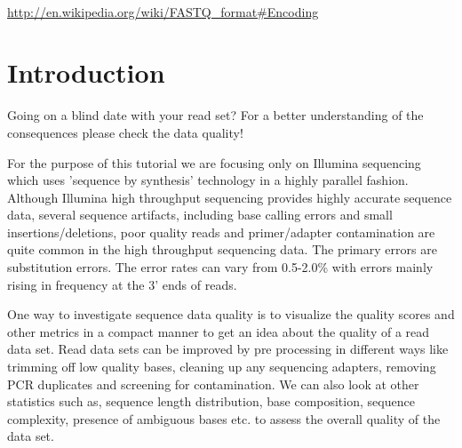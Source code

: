 \begin{description}[style=multiline,labelindent=0cm,align=left,leftmargin=0.5cm]
  \item[FASTQ Encoding]\hfill\\
    \url{http://en.wikipedia.org/wiki/FASTQ_format#Encoding}
\end{description}


\newpage

\section{Introduction}

\begin{note}
Going on a blind date with your read set? For a better understanding of the
consequences please check the data quality!
\end{note}

For the purpose of this tutorial we are focusing only on Illumina sequencing
which uses 'sequence by synthesis' technology in a highly parallel fashion.
Although Illumina high throughput  sequencing provides highly accurate sequence
data, several sequence artifacts, including base calling errors and small
insertions/deletions, poor quality reads and primer/adapter contamination are
quite common in the high throughput sequencing data. The primary errors are
substitution errors. The error rates can vary from 0.5-2.0\% with errors mainly
rising in frequency at the 3' ends of reads.

One way to investigate sequence data quality is to visualize the quality scores
and other metrics in a compact manner to get an idea about the quality of a read
data set. Read data sets can be improved by pre processing in different ways
like trimming off low quality bases, cleaning up any sequencing adapters,
removing PCR duplicates and screening for contamination. We can also look at other statistics such
as, sequence length distribution, base composition, sequence complexity,
presence of ambiguous bases etc. to assess the overall quality of the data set.

